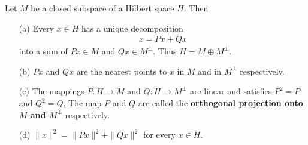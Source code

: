 \begin{theorem}
Let $M$ be a closed subspace of a Hilbert space $H.$ Then 
\begin{itemize}
\item [(a)] Every $x\in H$ has a unique decomposition 
\begin{align*}
x= Px + Qx
\end{align*}
into a sum of $Px\in M$ and $Qx\in M^{\perp}.$ Thus $H = M \oplus M^{\perp}.$
\item [(b)] $Px$ and $Qx$ are the nearest points to $x$ in $M$ and in $M^{\perp}$ respectively.

\item [(c)] The mappings $P: H \to M$ and $Q: H \to M^{\perp}$ are linear and satisfies $P^2=P$ and $Q^2=Q.$ The map $P$ and $Q$ are called the \textbf{orthogonal projection onto $M$ and $M^{\perp}$} respectively.

\item [(d)] $\|x\|^2= \|Px\|^2 + \|Qx\|^2$ for every $x\in H.$
\end{itemize}
\label{thm:existence-of-o-proj}
\end{theorem}

